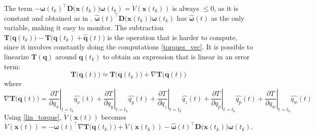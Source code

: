 \documentclass{article}
\begin{document}
		The term $-\boldsymbol \omega(t_k)^\top \mathbf{D(x}(t_k)) \boldsymbol \omega(t_k) = \dot V(\mathbf{x}(t_k))$ is always $\leq 0$, as it is constant and obtained as in \cite{lohmann_attitude}. $\hat{\boldsymbol \omega}(t)^\top \mathbf{D(x}(t_k)) \boldsymbol \omega(t_k)$ has $\hat{\boldsymbol \omega}(t)$ as the only variable, making it easy to monitor. The subtraction $\mathbf{T(q}(t_k)) - \mathbf{T(q}(t_k) + \mathbf{\hat{q}}(t))$ is the operation that is harder to compute, since it involves constantly doing the computations \ref{torques_vec}. It is possible to linearize $\mathbf{T(q)}$ around $\mathbf{q}(t_k)$ to obtain an expression that is linear in an error term:
		\begin{equation}
			\mathbf{T(q}(t)) \simeq \mathbf{T(q}(t_k)) +  \nabla \mathbf{T(q}(t)) 
			\label{lin_torque} 
		\end{equation}
		where
		\[
			\displaystyle \nabla \mathbf{T(q}(t)) =\left .\frac{\partial T}{\partial q_x}\right |_{t=t_k}\hat{q_x}(t) +
								\left .\frac{\partial T}{\partial q_y}\right |_{t=t_k}\hat{q_y}(t) +
								\left .\frac{\partial T}{\partial q_z}\right |_{t=t_k}\hat{q_z}(t) +
								\left .\frac{\partial T}{\partial q_p}\right |_{t=t_k}\hat{q_p}(t) +
								\left .\frac{\partial T}{\partial q_w}\right |_{t=t_k}\hat{q_w}(t)				
		\]
		Using \eqref{lin_torque}, $\dot V(\mathbf{x}(t))$ becomes
		\[
			\dot V(\mathbf{x}(t)) = -\boldsymbol \omega(t)^\top  \nabla \mathbf{T(q}(t_k)) + \dot V(\mathbf{x}(t_k)) - \hat{\boldsymbol \omega}(t)^\top \mathbf{D(x}(t_k)) \boldsymbol \omega(t_k).
		\]
		
\end{document}
